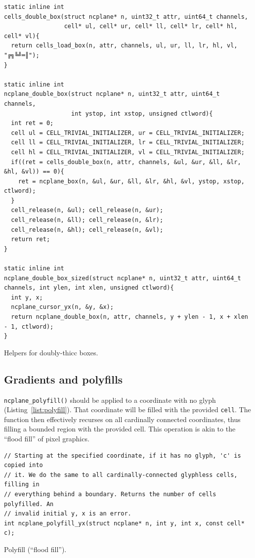 \documentclass[letterpaper,10pt]{article}
\begin{document}
\begin{listing}[!htb]
\begin{verbatim}
static inline int
cells_double_box(struct ncplane* n, uint32_t attr, uint64_t channels,
                 cell* ul, cell* ur, cell* ll, cell* lr, cell* hl, cell* vl){
  return cells_load_box(n, attr, channels, ul, ur, ll, lr, hl, vl, "╔╗╚╝═║");
}

static inline int
ncplane_double_box(struct ncplane* n, uint32_t attr, uint64_t channels,
                   int ystop, int xstop, unsigned ctlword){
  int ret = 0;
  cell ul = CELL_TRIVIAL_INITIALIZER, ur = CELL_TRIVIAL_INITIALIZER;
  cell ll = CELL_TRIVIAL_INITIALIZER, lr = CELL_TRIVIAL_INITIALIZER;
  cell hl = CELL_TRIVIAL_INITIALIZER, vl = CELL_TRIVIAL_INITIALIZER;
  if((ret = cells_double_box(n, attr, channels, &ul, &ur, &ll, &lr, &hl, &vl)) == 0){
    ret = ncplane_box(n, &ul, &ur, &ll, &lr, &hl, &vl, ystop, xstop, ctlword);
  }
  cell_release(n, &ul); cell_release(n, &ur);
  cell_release(n, &ll); cell_release(n, &lr);
  cell_release(n, &hl); cell_release(n, &vl);
  return ret;
}

static inline int
ncplane_double_box_sized(struct ncplane* n, uint32_t attr, uint64_t channels, int ylen, int xlen, unsigned ctlword){
  int y, x;
  ncplane_cursor_yx(n, &y, &x);
  return ncplane_double_box(n, attr, channels, y + ylen - 1, x + xlen - 1, ctlword);
}
\end{verbatim}
\caption{Helpers for doubly-thicc boxes.}
\label{list:doubleboxes}
\end{listing}

\subsection{Gradients and polyfills}
\texttt{ncplane\_polyfill()} should be applied to a coordinate with no glyph (Listing~\ref{list:polyfill}).
That coordinate will be filled with the provided \texttt{cell}. The function
then effectively recurses on all cardinally connected coordinates, thus filling
a bounded region with the provided cell. This operation is akin to the ``flood
fill'' of pixel graphics.

\begin{listing}[!htb]
\begin{verbatim}
// Starting at the specified coordinate, if it has no glyph, 'c' is copied into
// it. We do the same to all cardinally-connected glyphless cells, filling in
// everything behind a boundary. Returns the number of cells polyfilled. An
// invalid initial y, x is an error.
int ncplane_polyfill_yx(struct ncplane* n, int y, int x, const cell* c);
\end{verbatim}
\caption{Polyfill (``flood fill'').}
\label{list:polyfill}
\end{listing}
\end{document}
